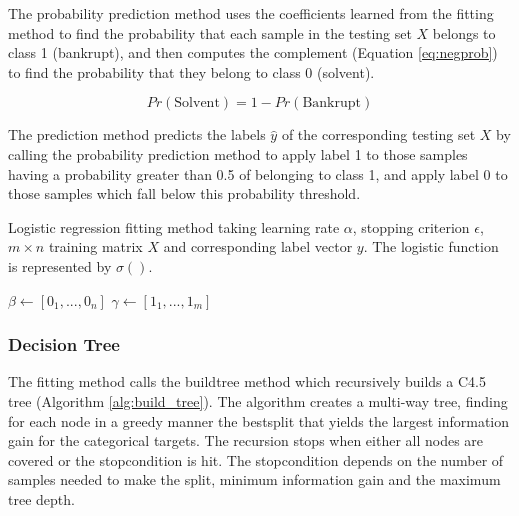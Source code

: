 \documentclass{article}[paper=a4,pagesize=auto,10pt]
\begin{document}
The probability prediction method uses the coefficients learned from the fitting method to find the probability that each sample in the testing set $X$ belongs to class 1 (bankrupt), and then computes the complement (Equation \ref{eq:negprob}) to find the probability that they belong to class 0 (solvent).\medskip

\begin{equation}\label{eq:negprob}
	Pr(\textrm{Solvent}) = 1 - Pr(\textrm{Bankrupt})
\end{equation}\smallskip

The prediction method predicts the labels $\hat{y}$ of the corresponding testing set $X$ by calling the probability prediction method to apply label 1 to those samples having a probability greater than 0.5 of belonging to class 1, and apply label 0 to those samples which fall below this probability threshold.\medskip

\begin{algorithm}[]
 \caption{Logistic regression fitting method taking learning rate $\alpha$, stopping criterion $\epsilon$, $m \times n$ training matrix $X$ and corresponding label vector $y$. The logistic function is represented by $\sigma()$.}
 $\beta \gets [0_1,...,0_n]$\;
 $\gamma \gets [1_1,...,1_m]$\;
 \label{alg:logit_fit}
\end{algorithm}\smallskip

\subsubsection{Decision Tree} \label{imp_decision_tree}

The fitting method calls the build\textunderscore tree method which recursively builds a C4.5 tree (Algorithm \ref{alg:build_tree}). The algorithm creates a multi-way tree, finding for each node in a greedy manner the best\textunderscore split that yields the largest information gain for the categorical targets. The recursion stops when either all nodes are covered or the stop\textunderscore condition is hit. The stop\textunderscore condition depends on the number of samples needed to make the split, minimum information gain and the maximum tree depth.\medskip
\end{document}
